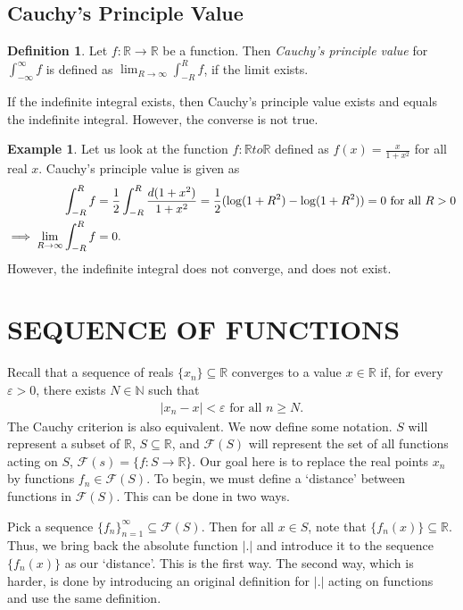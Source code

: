 \documentclass[15pt,a4paper]{book}
\theoremstyle{definition}
\newtheorem{definition}[theorem]{Definition}
\newtheorem{example}[theorem]{Example}
\newcommand{\eax}[1]{\emph{#1}\index{#1}} %
\newcommand{\abs}[1]{\left| #1 \right|} %
\newcommand{\N}{\mathbb{N}} %
\newcommand{\R}{\mathbb{R}} %
\newcommand{\cF}{\mathcal{F}}
\begin{document}
\section{Cauchy's Principle Value}
\begin{definition}
    Let $f:\R \to \R$ be a function. Then \eax{Cauchy's principle value} for $\int_{-\infty}^{\infty}f$ is defined as $\lim_{R \to \infty} \int_{-R}^{R} f$, if the limit exists.
\end{definition}
If the indefinite integral exists, then Cauchy's principle value exists and equals the indefinite integral. However, the converse is not true.

\begin{example}
    Let us look at the function $f:\R to \R$ defined as $f(x) = \frac{x}{1+x^{2}}$ for all real $x$. Cauchy's principle value is given as
    \begin{align}
        \int_{-R}^{R} f &= \frac{1}{2}\int_{-R}^{R} \frac{d(1+x^{2})}{1+x^{2}} = \frac{1}{2} (\log (1+R^{2}) - \log (1+R^{2})) = 0 \text{ for all } R > 0 \notag \\
        \implies \lim_{R \to \infty} \int_{-R}^{R} f &= 0.
    \end{align}
    However, the indefinite integral does not converge, and does not exist.
\end{example}


\chapter{SEQUENCE OF FUNCTIONS}

Recall that a sequence of reals $\{x_{n}\} \subseteq \R$ converges to a value $x \in \R$ if, for every $\varepsilon > 0$, there exists $N \in \N$ such that
\begin{align}
    \abs{x_{n}-x} < \varepsilon \text{ for all } n \geq N.
\end{align}
The Cauchy criterion is also equivalent. We now define some notation. $S$ will represent a subset of $\R$, $S \subseteq \R$, and $\cF(S)$ will represent the set of all functions acting on $S$, $\cF(s) = \{f:S \to \R\}$. Our goal here is to replace the real points $x_{n}$ by functions $f_{n} \in \cF(S)$. To begin, we must define a `distance' between functions in $\cF(S)$. This can be done in two ways.

Pick a sequence $\{f_{n}\}_{n=1}^{\infty} \subseteq \cF(S)$. Then for all $x \in S$, note that $\{f_{n}(x)\} \subseteq \R$. Thus, we bring back the absolute function $\abs{.}$ and introduce it to the sequence $\{f_{n}(x)\}$ as our `distance'. This is the first way. The second way, which is harder, is done by introducing an original definition for $\abs{.}$ acting on functions and use the same definition.
\end{document}
